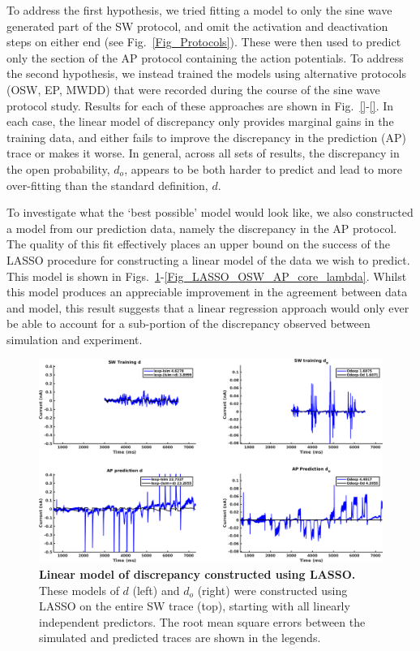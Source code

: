 \documentclass[11pt,a4paper,oneside]{article}
\begin{document}
{To address the first hypothesis, we tried fitting a model to only the sine wave generated part of the SW protocol, and omit the activation and deactivation steps on either end (see Fig.~\ref{Fig_Protocols}). These were then used to predict only the section of the AP protocol containing the action potentials. To address the second hypothesis, we instead trained the models using alternative protocols (OSW, EP, MWDD) that were recorded during the course of the sine wave protocol study. Results for each of these approaches are shown in Fig.~\ref{}-\ref{}. In each case, the linear model of discrepancy only provides marginal gains in the training data, and either fails to improve the discrepancy in the prediction (AP) trace or makes it worse. In general, across all sets of results, the discrepancy in the open probability, $d_o$, appears to be both harder to predict and lead to more over-fitting than the standard definition, $d$.

To investigate what the `best possible' model would look like, we also constructed a model from our prediction data, namely the discrepancy in the AP protocol. The quality of this fit effectively places an upper bound on the success of the LASSO procedure for constructing a linear model of the data we wish to predict. This model is shown in Figs.~\ref{Fig_LASSO_SW_AP_core_discrepancy}-\ref{Fig_LASSO_OSW_AP_core_lambda}. Whilst this model produces an appreciable improvement in the agreement between data and model, this result suggests that a linear regression approach would only ever be able to account for a sub-portion of the discrepancy observed between simulation and experiment.

\begin{figure}[t]
\begin{center}
\includegraphics[scale=0.42]{Figures/LASSO_SW_AP_core_discrepancy.png}
\caption{\textbf{Linear model of discrepancy constructed using LASSO.} These models of $d$ (left) and $d_o$ (right) were constructed using LASSO on the entire SW trace (top), starting with all linearly independent predictors. The root mean square errors between the simulated and predicted traces are shown in the legends. } 
\label{Fig_LASSO_SW_AP_core_discrepancy}
\end{center}
\end{figure}

}
\end{document}
